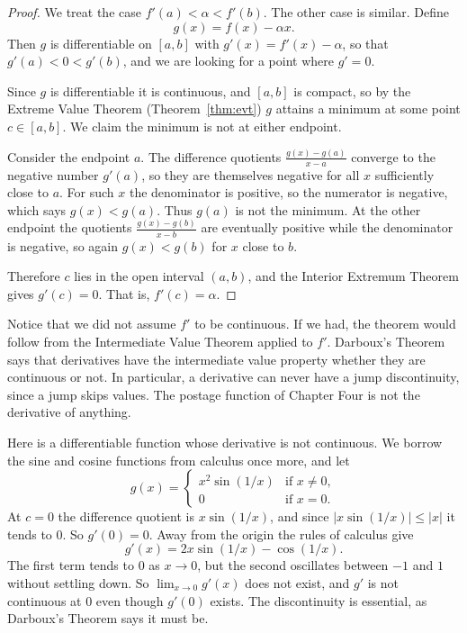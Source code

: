 \begin{proof}
We treat the case $f'(a) < \alpha < f'(b)$.  The other case is similar.  Define
\[ g(x) = f(x) - \alpha x. \]
Then $g$ is differentiable on $[a,b]$ with $g'(x) = f'(x) - \alpha$, so that $g'(a) < 0 < g'(b)$, and we are looking for a point where $g' = 0$.

Since $g$ is differentiable it is continuous, and $[a,b]$ is compact, so by the Extreme Value Theorem (Theorem~\ref{thm:evt}) $g$ attains a minimum at some point $c \in [a,b]$.  We claim the minimum is not at either endpoint.

Consider the endpoint $a$.  The difference quotients $\frac{g(x) - g(a)}{x - a}$ converge to the negative number $g'(a)$, so they are themselves negative for all $x$ sufficiently close to $a$.  For such $x$ the denominator is positive, so the numerator is negative, which says $g(x) < g(a)$.  Thus $g(a)$ is not the minimum.  At the other endpoint the quotients $\frac{g(x) - g(b)}{x - b}$ are eventually positive while the denominator is negative, so again $g(x) < g(b)$ for $x$ close to $b$.

Therefore $c$ lies in the open interval $(a,b)$, and the Interior Extremum Theorem gives $g'(c) = 0$.  That is, $f'(c) = \alpha$.
\end{proof}

Notice that we did not assume $f'$ to be continuous.  If we had, the theorem would follow from the Intermediate Value Theorem applied to $f'$.  Darboux's Theorem says that derivatives have the intermediate value property whether they are continuous or not.  In particular, a derivative can never have a jump discontinuity, since a jump skips values.  The postage function of Chapter Four is not the derivative of anything.

\begin{example}\label{ex:discontinuous-derivative}
Here is a differentiable function whose derivative is not continuous.  We borrow the sine and cosine functions from calculus once more, and let
\begin{displaymath}
   g(x) = \left\{
     \begin{array}{ll}
       x^2 \sin(1/x) & \text{if } x \neq 0, \\
       0 & \text{if } x = 0.
     \end{array}
   \right.
\end{displaymath}
At $c = 0$ the difference quotient is $x \sin(1/x)$, and since $|x \sin(1/x)| \leq |x|$ it tends to $0$.  So $g'(0) = 0$.  Away from the origin the rules of calculus give
\[ g'(x) = 2x \sin(1/x) - \cos(1/x). \]
The first term tends to $0$ as $x \to 0$, but the second oscillates between $-1$ and $1$ without settling down.  So $\lim_{x \to 0} g'(x)$ does not exist, and $g'$ is not continuous at $0$ even though $g'(0)$ exists.  The discontinuity is essential, as Darboux's Theorem says it must be.
\end{example}


